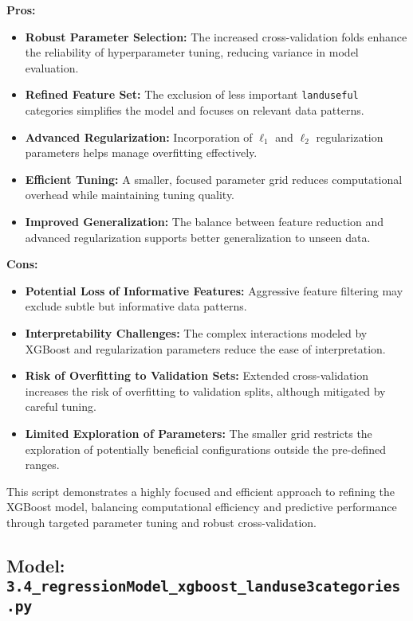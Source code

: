 \textbf{Pros:}
\begin{itemize}
    \item \textbf{Robust Parameter Selection:} The increased cross-validation folds enhance the reliability of hyperparameter tuning, reducing variance in model evaluation.
    \item \textbf{Refined Feature Set:} The exclusion of less important \texttt{landuseful} categories simplifies the model and focuses on relevant data patterns.
    \item \textbf{Advanced Regularization:} Incorporation of \(\ell_1\) and \(\ell_2\) regularization parameters helps manage overfitting effectively.
    \item \textbf{Efficient Tuning:} A smaller, focused parameter grid reduces computational overhead while maintaining tuning quality.
    \item \textbf{Improved Generalization:} The balance between feature reduction and advanced regularization supports better generalization to unseen data.
\end{itemize}

\textbf{Cons:}
\begin{itemize}
    \item \textbf{Potential Loss of Informative Features:} Aggressive feature filtering may exclude subtle but informative data patterns.
    \item \textbf{Interpretability Challenges:} The complex interactions modeled by XGBoost and regularization parameters reduce the ease of interpretation.
    \item \textbf{Risk of Overfitting to Validation Sets:} Extended cross-validation increases the risk of overfitting to validation splits, although mitigated by careful tuning.
    \item \textbf{Limited Exploration of Parameters:} The smaller grid restricts the exploration of potentially beneficial configurations outside the pre-defined ranges.
\end{itemize}

This script demonstrates a highly focused and efficient approach to refining the XGBoost model, balancing computational efficiency and predictive performance through targeted parameter tuning and robust cross-validation. \\

\hrulefill

\subsection{Model: \texttt{3.4\_regressionModel\_xgboost\_landuse3categories.py}}

